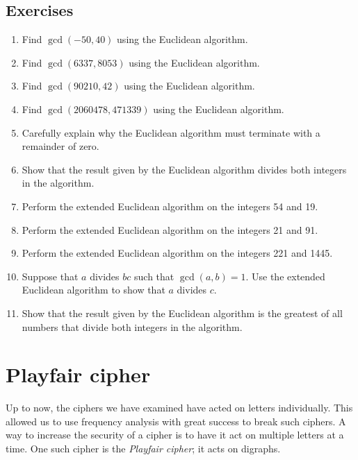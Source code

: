 \documentclass{book}
\theoremstyle{plain}
\theoremstyle{definition}
\newif\ifprintsolutions
\newcommand{\solution}[1]{\ifprintsolutions \begin{sloppypar}{\it #1}\end{sloppypar} \fi} %
\begin{document}
\section{Exercises}
\begin{enumerate}
\item Find $\gcd(-50,40)$ using the Euclidean algorithm. \solution{$\gcd(-50,40) = 10$}
\item Find $\gcd(6337,8053)$ using the Euclidean algorithm. \solution{$\gcd(6337,8053) = 1$}
\item Find $\gcd(90210,42)$ using the Euclidean algorithm. \solution{$\gcd(90210,42) = 6$}
\item Find $\gcd(2060478,471339)$ using the Euclidean algorithm. \solution{$\gcd(2060478,471339) = 1863$}
\item Carefully explain why the Euclidean algorithm must terminate with a remainder of zero. \solution{The remainder is always a positive integer and must strictly decrease at each step.}
\item Show that the result given by the Euclidean algorithm divides both integers in the algorithm.
\item Perform the extended Euclidean algorithm on the integers 54 and 19. \solution{$1 = 6 \times 54 - 17 \times 19$}
\item Perform the extended Euclidean algorithm on the integers 21 and 91. \solution{$7 = 1 \times 91 - 4 \times 21$}
\item Perform the extended Euclidean algorithm on the integers 221 and 1445. \solution{$17 = 2 \times 1445 - 13 \times 221$}
\item Suppose that $a$ divides $bc$ such that $\gcd(a,b) = 1$. Use the extended Euclidean algorithm to show that $a$ divides $c$. \solution{Write $1 = ma + nb$ and multiply to obtain $c = mac + nbc$. Then use divisibility.}
\item Show that the result given by the Euclidean algorithm is the greatest of all numbers that divide both integers in the algorithm.
\end{enumerate}

\chapter{Playfair cipher}
Up to now, the ciphers we have examined have acted on letters individually. This allowed us to use frequency analysis with great success to break such ciphers. A way to increase the security of a cipher is to have it act on multiple letters at a time. One such cipher is the {\it Playfair cipher}; it acts on digraphs.
\end{document}
